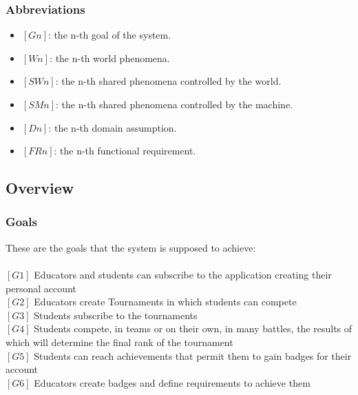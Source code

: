 \documentclass{article}
\begin{document}
\subsubsection{Abbreviations}
\begin{itemize}
    \item \textbf{$[Gn]$}: the n-th goal of the system.
    \item \textbf{$[Wn]$}: the n-th world phenomena.
    \item \textbf{$[SWn]$}: the n-th shared phenomena controlled by the world.
    \item \textbf{$[SMn]$}: the n-th shared phenomena controlled by the machine.
    \item \textbf{$[Dn]$}: the n-th domain assumption.
    \item \textbf{$[FRn]$}: the n-th functional requirement.
\end{itemize}

\subsection{Overview}
\subsubsection{Goals}
These are the goals that the system is supposed to achieve:\\\\
$[G1]$ Educators and students can subscribe to the application creating their personal account \\
$[G2]$ Educators create Tournaments in which students can compete \\
$[G3]$ Students subscribe to the tournaments \\
$[G4]$ Students compete, in teams or on their own, in many battles, the results of which will determine the final rank of the tournament  \\
$[G5]$ Students can reach achievements that permit them to gain badges for their account \\
$[G6]$ Educators create badges and define requirements to achieve them \\
\newpage
\end{document}

